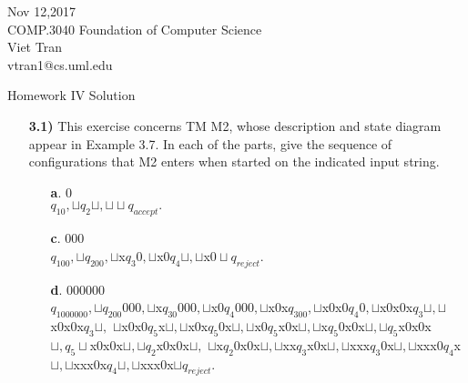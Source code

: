 \documentclass[12pt]{letter}
\begin{document}
Nov 12,2017 \\COMP.3040 Foundation of Computer Science \\ Viet Tran \\vtran1@cs.uml.edu

\centering Homework IV Solution

\flushleft

\begin{enumerate}

\item[\textbf{3.1)}]This exercise concerns TM M2, whose description and state diagram appear in Example 3.7. In each of the parts, give the sequence of configurations that M2 enters when started on the indicated input string.
\begin{enumerate}
	\item[\textbf{a}.] 0 \\
		$q_10,\sqcup q_2 \sqcup, \sqcup \sqcup q_{accept}.$ 

	\item[\textbf{c}.] 000 \\
		$q_100, \sqcup q_200, \sqcup $x$ q_3 0,\sqcup $x$0q_4\sqcup, \sqcup $x$0 \sqcup q_{reject}. $

	\item[\textbf{d}.] 000000 \\
		$q_1000000,\sqcup q_200 000,\sqcup $x$q_30 000, \sqcup $x$0 q_4 000, \sqcup $x0x$ q_300, \sqcup $x0x$ 0 q_4 0, \sqcup $x0x0x$q_3 \sqcup,\sqcup$x0x0x$q_3\sqcup,$
		$ \sqcup$x0x0$q_5$x$\sqcup,\sqcup$x0x$q_5$0x$\sqcup, \sqcup$x0$q_5$x0x$\sqcup,\sqcup$x$q_5$0x0x$\sqcup,\sqcup q_5$x0x0x$\sqcup, q_5\sqcup$x0x0x$\sqcup, \sqcup q_2$x0x0x$\sqcup,$
		$\sqcup$x$q_2$0x0x$\sqcup, \sqcup$xx$q_3$x0x$\sqcup,\sqcup$xxx$q_3$0x$\sqcup, \sqcup$xxx0$q_4$x$\sqcup,\sqcup$xxx0x$q_4\sqcup, \sqcup$xxx0x$\sqcup q_{reject}.$


\end{enumerate}
\end{enumerate}
\end{document}
